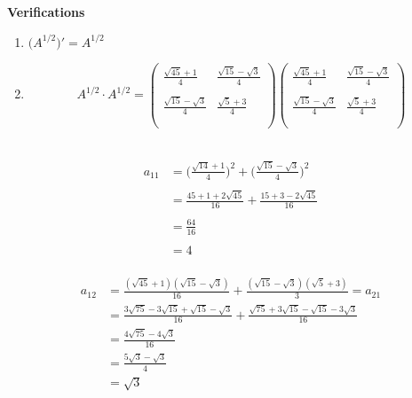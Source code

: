 \documentclass[11pt,a4paper]{article}
\theoremstyle{definition}
\begin{document}
\textbf{Verifications}
\begin{enumerate}
\item $\big(A^{1/2}\big)' = A^{1/2}$\\


\item $$A^{1/2}\cdot A^{1/2} = 
\begin{pmatrix}
\frac{\sqrt{45} + 1}{4} & \frac{\sqrt{15}-\sqrt{3}}{4}\\\\
\frac{\sqrt{15}-\sqrt{3}}{4} & \frac{\sqrt{5}+3}{4}\\\\
\end{pmatrix}
\begin{pmatrix}
\frac{\sqrt{45} + 1}{4} & \frac{\sqrt{15}-\sqrt{3}}{4}\\\\
\frac{\sqrt{15}-\sqrt{3}}{4} & \frac{\sqrt{5}+3}{4}\\\\
\end{pmatrix}
$$\\
\end{enumerate}






\begin{align*}
a_{11} & = \Bigg(\frac{\sqrt{14}+1}{4}\Bigg)^2 + \Bigg(\frac{\sqrt{15}-\sqrt{3}}{4}\Bigg)^2\\\\
       & = \frac{45 + 1 + 2\sqrt{45}}{16} + \frac{15 + 3 - 2\sqrt{45}}{16}\\\\
       & = \frac{64}{16}\\\\
       & =4\\
\end{align*}






















\begin{align*}
a_{12} & = \frac{(\sqrt{45}+1)(\sqrt{15}-\sqrt{3})}{16}+\frac{(\sqrt{15}-\sqrt{3})(\sqrt{5}+3)}{3}=a_{21}\\
       & = \frac{3\sqrt{75}-3\sqrt{15}+\sqrt{15}-\sqrt{3}}{16}+ \frac{\sqrt{75}+3\sqrt{15}-\sqrt{15}-3\sqrt{3}}{16}\\
       & = \frac{4\sqrt{75}-4\sqrt{3}}{16}\\
       & = \frac{5\sqrt{3}-\sqrt{3}}{4}\\
       & = \sqrt{3}\\
\end{align*}
\end{document}
